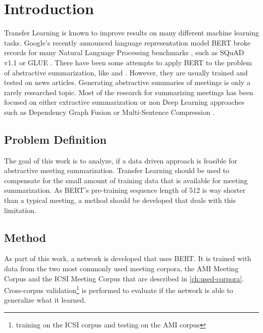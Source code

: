 \chapter{Introduction}\label{ch:Introduction}


Transfer Learning is known to improve results on many different machine learning tasks.
Google's recently announced language representation model BERT broke records for many Natural Language Processing benchmarks \cite[p.~5--7]{devlin2018bert}, such as  SQuAD v1.1 \cite{rajpurkar-etal-2016-squad} or GLUE \cite{1804.07461}.
There have been some attempts to apply BERT to the problem of abstractive summarization, like \cite{1902.09243} and \cite{1908.08345}.
However, they are usually trained and tested on news articles.
Generating abstractive summaries of meetings is only a rarely researched topic.
Most of the research for summarizing meetings has been focused on either extractive summarization or non Deep Learning approaches such as Dependency Graph Fusion \cite{1609.07035} or Multi-Sentence Compression \cite{shang-etal-2018-unsupervised}.


\section{Problem Definition}

The goal of this work is to analyze, if a data driven approach is feasible for abstractive meeting summarization.
Transfer Learning should be used to compensate for the small amount of training data that is available for meeting summarization.
As BERT's pre-training sequence length of 512 \cite[p.~13]{devlin2018bert} is way shorter than a typical meeting, a method should be developed that deals with this limitation.


\section{Method}

As part of this work, a network is developed that uses BERT.
It is trained with data from the two most commonly used meeting corpora, the AMI Meeting Corpus \cite{Mccowan05theami} and the ICSI Meeting Corpus \cite{Janin} that are described in \autoref{ch:used-corpora}.
Cross-corpus validation\footnote{\Eg training on the ICSI corpus and testing on the AMI corpus} is performed to evaluate if the network is able to generalize what it learned.

